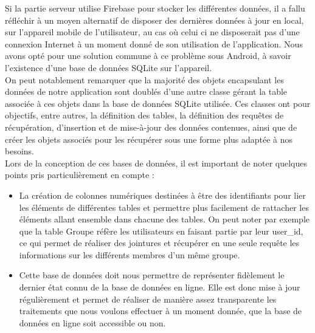 Si la partie serveur utilise Firebase pour stocker les différentes données, il a fallu réfléchir à un moyen alternatif de disposer des dernières données à jour en local, sur l'appareil mobile de l'utilisateur, au cas où celui ci ne disposerait pas d'une connexion Internet à un moment donné de son utilisation de l'application. Nous avons opté pour une solution commune à ce problème sous Android, à savoir l'existence d'une base de données SQLite sur l'appareil. \\
On peut notablement remarquer que la majorité des objets encapsulant les données de notre application sont doublés d'une autre classe gérant la table associée à ces objets dans la base de données SQLite utilisée. Ces classes ont pour objectifs, entre autres, la définition des tables, la définition des requêtes de récupération, d'insertion et de mise-à-jour des données contenues, ainsi que de créer les objets associés pour les récupérer sous une forme plus adaptée à nos besoins.\\
Lors de la conception de ces bases de données, il est important de noter quelques points pris particulièrement en compte :
\begin{itemize}
\item La création de colonnes numériques destinées à être des identifiants pour lier les éléments de différentes tables et
    permettre plus facilement de rattacher les éléments allant ensemble dans chacune des tables. On peut noter par exemple que la
    table Groupe réfère les utilisateurs en faisant partie par leur user\_id, ce qui permet de réaliser des jointures et récupérer en une seule requête les informations sur les différents membres d'un même groupe.
\item Cette base de données doit nous permettre de représenter fidèlement le dernier état connu de la base de données en ligne. Elle est donc mise à jour régulièrement et permet de réaliser de manière assez transparente les traitements que nous voulons effectuer à un moment donnée, que la base de données en ligne soit accessible ou non.
\end{itemize}
